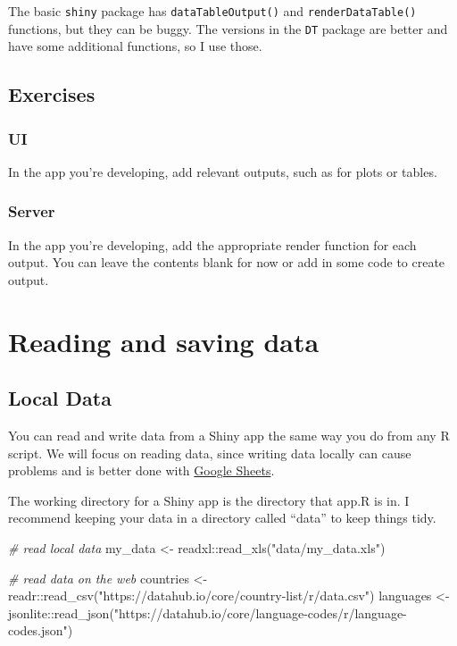 \documentclass[
]{book}
\newenvironment{Shaded}{\begin{snugshade}}{\end{snugshade}}
\newcommand{\CommentTok}[1]{\textcolor[rgb]{0.56,0.35,0.01}{\textit{#1}}}
\newcommand{\FunctionTok}[1]{\textcolor[rgb]{0.00,0.00,0.00}{#1}}
\newcommand{\NormalTok}[1]{#1}
\newcommand{\OtherTok}[1]{\textcolor[rgb]{0.56,0.35,0.01}{#1}}
\newcommand{\SpecialCharTok}[1]{\textcolor[rgb]{0.00,0.00,0.00}{#1}}
\newcommand{\StringTok}[1]{\textcolor[rgb]{0.31,0.60,0.02}{#1}}
\begin{document}
The basic \texttt{shiny} package has \texttt{dataTableOutput()} and \texttt{renderDataTable()} functions, but they can be buggy. The versions in the \texttt{DT} package are better and have some additional functions, so I use those.

\hypertarget{exercises-outputs}{%
\section{Exercises}\label{exercises-outputs}}

\hypertarget{ui-1}{%
\subsection{UI}\label{ui-1}}

In the app you're developing, add relevant outputs, such as for plots or tables.

\hypertarget{server}{%
\subsection{Server}\label{server}}

In the app you're developing, add the appropriate render function for each output. You can leave the contents blank for now or add in some code to create output.

\hypertarget{data}{%
\chapter{Reading and saving data}\label{data}}

\hypertarget{local-data}{%
\section{Local Data}\label{local-data}}

You can read and write data from a Shiny app the same way you do from any R script. We will focus on reading data, since writing data locally can cause problems and is better done with \protect\hyperlink{google_sheets}{Google Sheets}.

The working directory for a Shiny app is the directory that app.R is in. I recommend keeping your data in a directory called ``data'' to keep things tidy.

\begin{Shaded}
\begin{Highlighting}[]
\CommentTok{\# read local data}
\NormalTok{my\_data }\OtherTok{\textless{}{-}}\NormalTok{ readxl}\SpecialCharTok{::}\FunctionTok{read\_xls}\NormalTok{(}\StringTok{"data/my\_data.xls"}\NormalTok{)}

\CommentTok{\# read data on the web}
\NormalTok{countries }\OtherTok{\textless{}{-}}\NormalTok{ readr}\SpecialCharTok{::}\FunctionTok{read\_csv}\NormalTok{(}\StringTok{"https://datahub.io/core/country{-}list/r/data.csv"}\NormalTok{)}
\NormalTok{languages }\OtherTok{\textless{}{-}}\NormalTok{ jsonlite}\SpecialCharTok{::}\FunctionTok{read\_json}\NormalTok{(}\StringTok{"https://datahub.io/core/language{-}codes/r/language{-}codes.json"}\NormalTok{)}
\end{Highlighting}
\end{Shaded}
\end{document}
